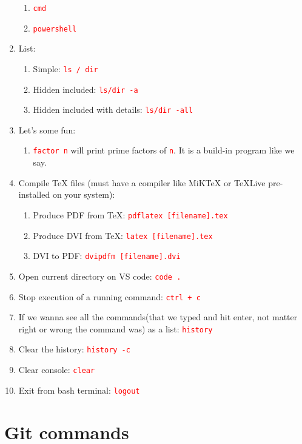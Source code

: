 \documentclass[12 pt, letterpaper]{extarticle}
\newcommand{\R}{\textcolor{red}} %
\newcommand{\T}{\texttt}
\begin{document}
\begin{enumerate}
\begin{enumerate}
			\item \R{\T{cmd}}
			\item \R{\T{powershell}}
		\end{enumerate}
	
	\item List:
		\begin{enumerate}
			\item Simple: \R{\T{ls / dir}}
			\item Hidden included: \R{\T{ls/dir -a}}
			\item Hidden included with details: \R{\T{ls/dir -all}}
		\end{enumerate}
		
	\item Let's some fun:
		\begin{enumerate}
			\item \R{\T{factor n}} will print prime factors of \R{\T{n}}. It is a build-in program like we say.
		\end{enumerate}
		
	\item Compile TeX files (must have a compiler like MiKTeX or TeXLive pre-installed on your system):
		\begin{enumerate}
			\item Produce PDF from TeX: \R{\T{pdflatex [filename].tex}}
			\item Produce DVI from TeX: \R{\T{latex [filename].tex}}
			\item DVI to PDF: \R{\T{dvipdfm [filename].dvi}}
		\end{enumerate}
	
	\item Open current directory on VS code: \R{\T{code .}}
	\item Stop execution of a running command: \R{\T{ctrl + c}}
	\item If we wanna see all the commands(that we typed and hit enter, not matter right or wrong the command was) as a list: \R{\T{history}}
	\item Clear the history: \R{\T{history -c}}
	\item Clear console: \R{\T{clear}}
	\item Exit from bash terminal: \R{\T{logout}}
\end{enumerate}

\section*{Git commands}
\end{document}
